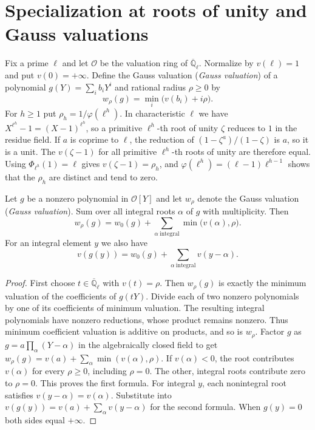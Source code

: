\section{Specialization at roots of unity and Gauss valuations}
\label{sec:c-gauss-valuation}

Fix a prime $\ell$ and let $\mathcal O$ be the valuation ring of $\overline{\mathbb Q}_\ell$. Normalize by $v(\ell)=1$ and put $v(0)=+\infty$. Define the Gauss valuation (\emph{Gauss valuation}) of a polynomial $g(Y)=\sum_i b_iY^i$ and rational radius $\rho\ge0$ by~\cite{BGR1984}
\[
 w_\rho(g)=\min_i\bigl(v(b_i)+i\rho\bigr).
\]
For $h\ge1$ put $\rho_h=1/\varphi(\ell^h)$. In characteristic $\ell$ we have $X^{\ell^h}-1=(X-1)^{\ell^h}$, so a primitive $\ell^h$-th root of unity $\zeta$ reduces to $1$ in the residue field.
If $a$ is coprime to $\ell$, the reduction of $(1-\zeta^a)/(1-\zeta)$ is $a$, so it is a unit. The $v(\zeta-1)$ for all primitive $\ell^h$-th roots of unity are therefore equal. Using $\Phi_{\ell^h}(1)=\ell$ gives $v(\zeta-1)=\rho_h$, and $\varphi(\ell^h)=(\ell-1)\ell^{h-1}$ shows that the $\rho_h$ are distinct and tend to zero.

\begin{lemma}
\label{lem:c-gauss-valuation-roots}
\emitthmsource
Let $g$ be a nonzero polynomial in $\mathcal O[Y]$ and let $w_\rho$ denote the Gauss valuation (\emph{Gauss valuation}). Sum over all integral roots $\alpha$ of $g$ with multiplicity. Then
\[
 w_\rho(g)=w_0(g)+\sum_{\alpha\ \text{integral}}\min\bigl(v(\alpha),\rho\bigr).
\]
For an integral element $y$ we also have
\[
 v(g(y))=w_0(g)+\sum_{\alpha\ \text{integral}}v(y-\alpha).
\]
\end{lemma}
\begin{proof}
First choose $t\in\overline{\mathbb Q}_\ell$ with $v(t)=\rho$. Then $w_\rho(g)$ is exactly the minimum valuation of the coefficients of $g(tY)$.
Divide each of two nonzero polynomials by one of its coefficients of minimum valuation. The resulting integral polynomials have nonzero reductions, whose product remains nonzero. Thus minimum coefficient valuation is additive on products, and so is $w_\rho$.
Factor $g$ as $g=a\prod_\alpha(Y-\alpha)$ in the algebraically closed field to get $w_\rho(g)=v(a)+\sum_\alpha\min(v(\alpha),\rho)$.
If $v(\alpha)<0$, the root contributes $v(\alpha)$ for every $\rho\ge0$, including $\rho=0$. The other, integral roots contribute zero to $\rho=0$. This proves the first formula.
For integral $y$, each nonintegral root satisfies $v(y-\alpha)=v(\alpha)$. Substitute into $v(g(y))=v(a)+\sum_\alpha v(y-\alpha)$ for the second formula. When $g(y)=0$ both sides equal $+\infty$.
\end{proof}

